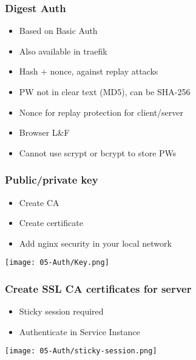 \subsubsection{Digest Auth}
\begin{itemize}
    \item Based on Basic Auth
    \item Also available in traefik
    \item Hash + nonce, against replay attacks
\end{itemize}
\begin{itemize}[label={\textcolor{ForestGreen}{+}}]
    \item PW not in clear text (MD5), can be SHA-256
    \item Nonce for replay protection for client/server
\end{itemize}
\begin{itemize}[label={\textcolor{red}{--}}]
    \item Browser L\&F
    \item Cannot use scrypt or bcrypt to store PWs
\end{itemize}

\subsubsection{Public/private key}
\begin{itemize}
    \item Create CA
    \item Create certificate
    \item Add nginx security in your local network
\end{itemize}
\begin{center}
    \texttt{[image: 05-Auth/Key.png]}
\end{center}

\subsubsection{Create SSL CA certificates for server}
\begin{itemize}
    \item Sticky session required
    \item Authenticate in Service Instance
\end{itemize}
\begin{center}
    \texttt{[image: 05-Auth/sticky-session.png]}
\end{center}


